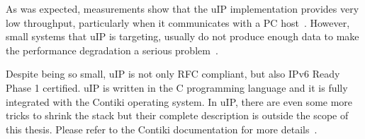 As was expected, measurements show that the uIP implementation provides very low
throughput, particularly when it communicates with a PC host~\cite{thesis-towards}.
However, small systems that uIP is targeting, usually do not produce enough data
to make the performance degradation a serious problem~\cite{thesis-towards}.

Despite being so small, uIP is not only RFC compliant, but also IPv6 Ready Phase 1 certified.
uIP is written in the C programming language and it is fully integrated with the Contiki operating system.
In uIP, there are even some more tricks to shrink the stack
but their complete description is outside the scope of this thesis.
Please refer to the Contiki documentation for more details~\cite{contiki-docs}.
